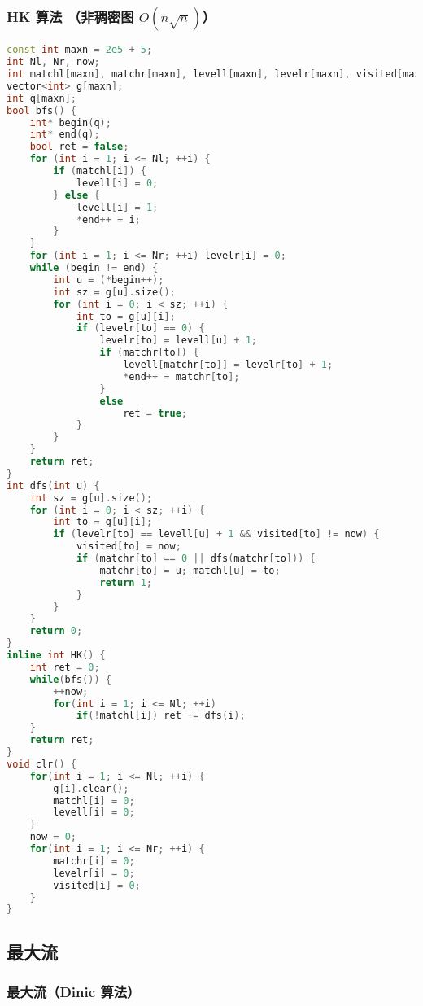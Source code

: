 \subsubsection{HK 算法 （非稠密图 $O(n\sqrt{n})$）}

\begin{lstlisting}[language=C++]
const int maxn = 2e5 + 5;
int Nl, Nr, now;
int matchl[maxn], matchr[maxn], levell[maxn], levelr[maxn], visited[maxn];
vector<int> g[maxn];
int q[maxn];
bool bfs() {
    int* begin(q);
    int* end(q);
    bool ret = false;
    for (int i = 1; i <= Nl; ++i) {
        if (matchl[i]) {
            levell[i] = 0;
        } else {
            levell[i] = 1;
            *end++ = i;
        }
    }
    for (int i = 1; i <= Nr; ++i) levelr[i] = 0;
    while (begin != end) {
        int u = (*begin++);
        int sz = g[u].size();
        for (int i = 0; i < sz; ++i) {
            int to = g[u][i];
            if (levelr[to] == 0) {
                levelr[to] = levell[u] + 1;
                if (matchr[to]) {
                    levell[matchr[to]] = levelr[to] + 1;
                    *end++ = matchr[to];
                }
                else
                    ret = true;
            }
        }
    }
    return ret;
}
int dfs(int u) {
    int sz = g[u].size();
    for (int i = 0; i < sz; ++i) {
        int to = g[u][i];
        if (levelr[to] == levell[u] + 1 && visited[to] != now) {
            visited[to] = now;
            if (matchr[to] == 0 || dfs(matchr[to])) {
                matchr[to] = u; matchl[u] = to;
                return 1;
            }
        }
    }
    return 0;
}
inline int HK() {
    int ret = 0;
    while(bfs()) {
        ++now;
        for(int i = 1; i <= Nl; ++i)
            if(!matchl[i]) ret += dfs(i);
    }
    return ret;
}
void clr() {
    for(int i = 1; i <= Nl; ++i) {
        g[i].clear();
        matchl[i] = 0;
        levell[i] = 0;
    }
    now = 0;
    for(int i = 1; i <= Nr; ++i) {
        matchr[i] = 0;
        levelr[i] = 0;
        visited[i] = 0;
    }
}
\end{lstlisting}

\subsection{最大流}

\subsubsection{最大流（Dinic 算法）}

